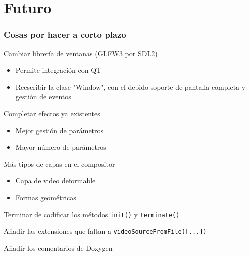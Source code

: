 \documentclass{beamer}
\begin{document}
%
%
\section{Futuro}

\begin{frame}[t] \frametitle{Cosas por hacer a corto plazo}
	\begin{itemize}
		\begin{item}
			Cambiar librería de ventanas (GLFW3 por SDL2)
			\begin{itemize}
				\item{Permite integración con QT}
				\item{Reescribir la clase "Window", con el debido soporte de pantalla completa y gestión de eventos}
			\end{itemize}
		\end{item}
		\begin{item}
			Completar efectos ya existentes
			\begin{itemize}
				\item{Mejor gestión de parámetros}
				\item{Mayor número de parámetros}
			\end{itemize}
		\end{item}
		\begin{item}
			Más tipos de capas en el compositor
			\begin{itemize}
				\item{Capa de video deformable}
				\item{Formas geométricas}
			\end{itemize}
		\end{item}
		\begin{item}
			Terminar de codificar los métodos \texttt{init()} y \texttt{terminate()}
		\end{item}
		\begin{item}
			Añadir las extensiones que faltan a \texttt{videoSourceFromFile([...])}
		\end{item}
		\begin{item}
			Añadir los comentarios de Doxygen
		\end{item}
	\end{itemize}
\end{frame}
\end{document}
